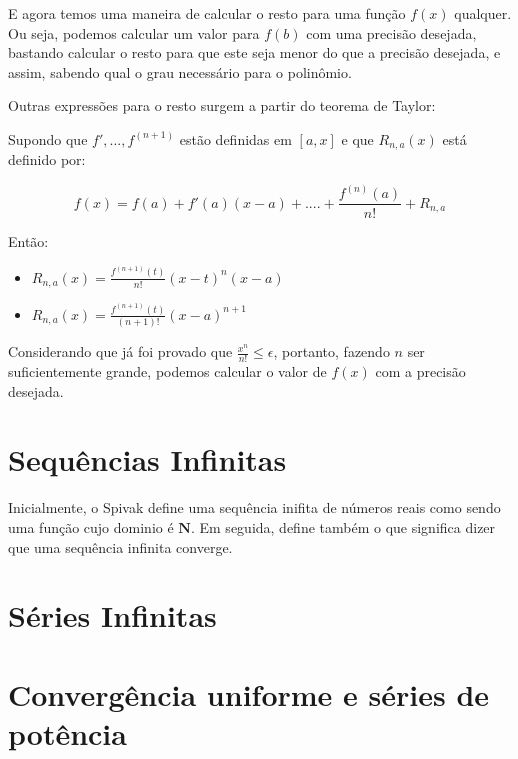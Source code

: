 \documentclass[a4paper, 12pt]{article}
\begin{document}
E agora temos uma maneira de calcular o resto para uma função $f(x)$ qualquer. Ou seja,
podemos calcular um valor para $f(b)$ com uma precisão desejada, bastando calcular o resto para que
este seja menor do que a precisão desejada, e assim, sabendo qual o grau necessário para o
polinômio.

Outras expressões para o resto surgem a partir do teorema de Taylor:

Supondo que $f',...,f^{(n+1)}$ estão definidas em $[a,x]$ e que $R_{n,a}(x)$ está definido por:

\begin{equation}
	f(x) = f(a) + f'(a)(x-a) + .... + \frac{f^{(n)}(a)}{n!} + R_{n,a}
\end{equation}

Então:

\begin{itemize}
	\item $R_{n,a}(x) = \frac{f^{(n+1)}(t)}{n!}(x-t)^n (x-a)$
	\item $R_{n,a}(x) = \frac{f^{(n+1)}(t)}{(n + 1)!}(x-a)^{n+1}$
\end{itemize}

Considerando que já foi provado que $\frac{x^n}{n!} \leq \epsilon$, portanto, fazendo $n$ ser
suficientemente grande, podemos calcular o valor de $f(x)$ com a precisão desejada.

\newpage
\section{Sequências Infinitas}

Inicialmente, o Spivak define uma sequência inifita de números reais como sendo uma função
cujo dominio é $\mathbf{N}$. Em seguida, define também o que significa dizer que uma sequência
infinita converge.

\newpage

\section{Séries Infinitas}

\newpage
\section{Convergência uniforme e séries de potência}
\end{document}
